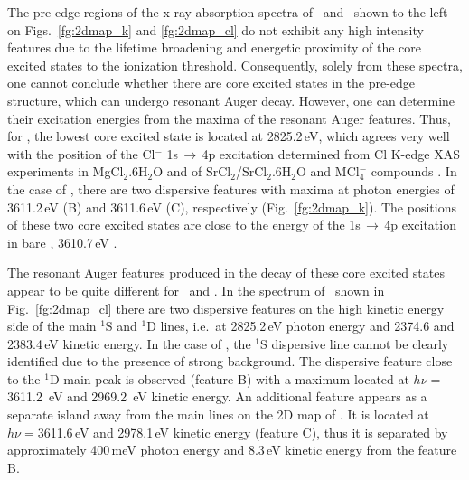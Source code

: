 The pre-edge regions of the x-ray absorption spectra of \ki~and \cli~shown to the left on Figs.\ \ref{fg:2dmap_k} and \ref{fg:2dmap_cl} do not exhibit any high intensity features due to the lifetime broadening and energetic proximity of the core excited states to the ionization threshold. Consequently, solely from these spectra, one cannot conclude whether there are core excited states in the pre-edge structure, which can undergo resonant Auger decay. However, one can determine their excitation energies from the maxima of the resonant Auger features. Thus, for \cli, the lowest core excited state is located at 2825.2\,eV, which agrees very well with the position of the Cl$^{-}$ 1s$\,\rightarrow\,$4p excitation determined from Cl K-edge XAS experiments in MgCl$_2$.6H$_2$O and of SrCl$_2$/SrCl$_2$.6H$_2$O \citep{sugiura82:681} and MCl$_{4}^{-}$ compounds \citep{shadle95:2259}. In the case of \ki, there are two dispersive features with maxima at photon energies of 3611.2\,eV (B) and 3611.6\,eV (C), respectively (Fig.\ \ref{fg:2dmap_k}). The positions of these two core excited states are close to the energy of the 1s$\,\rightarrow\,$4p excitation in bare \ki, 3610.7\,eV \citep{hertlein06:062715}.


The resonant Auger features produced in the decay of these core excited states appear to be quite different for \cli~and \ki. In the spectrum of \cli~shown in Fig.\ \ref{fg:2dmap_cl} there are two dispersive features on the high kinetic energy side of the main $^1$S and $^1$D lines, i.e.\ at 2825.2\,eV photon energy and 2374.6 and 2383.4\,eV kinetic energy. In the case of \ki, the $^1$S dispersive line cannot be clearly identified due to the presence of strong background. The dispersive feature close to the $^1$D main peak is observed (feature B) with a maximum located at $h\nu = $3611.2 \,eV and 2969.2 \,eV kinetic energy. An additional feature appears as a separate island away from the main lines on the 2D map of \ki. It is located at $h\nu = $3611.6\,eV and 2978.1\,eV kinetic energy (feature C), thus it is separated by approximately 400\,meV photon energy and 8.3\,eV kinetic energy from the feature B. 

